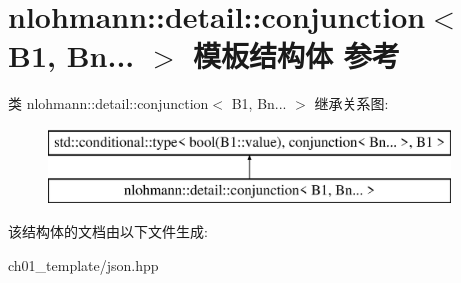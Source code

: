 \hypertarget{structnlohmann_1_1detail_1_1conjunction_3_01_b1_00_01_bn_8_8_8_01_4}{}\section{nlohmann\+::detail\+::conjunction$<$ B1, Bn... $>$ 模板结构体 参考}
\label{structnlohmann_1_1detail_1_1conjunction_3_01_b1_00_01_bn_8_8_8_01_4}
类 nlohmann\+::detail\+::conjunction$<$ B1, Bn... $>$ 继承关系图\+:\begin{figure}[H]
\begin{center}
\leavevmode
\includegraphics[height=2.000000cm]{structnlohmann_1_1detail_1_1conjunction_3_01_b1_00_01_bn_8_8_8_01_4}
\end{center}
\end{figure}


该结构体的文档由以下文件生成\+:\begin{DoxyCompactItemize}
\item 
ch01\+\_\+template/json.\+hpp\end{DoxyCompactItemize}
